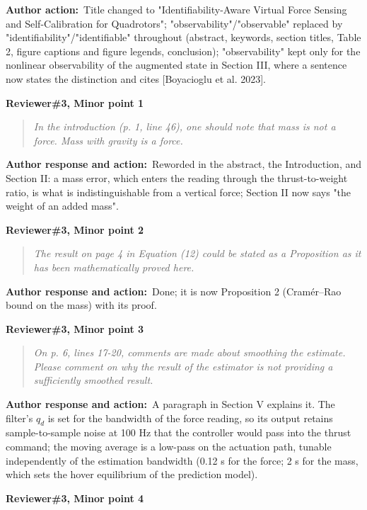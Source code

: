 \documentclass[11pt]{article}
\newcommand{\concern}[1]{\par\medskip\noindent\colorbox{gray!12}{\parbox{\dimexpr\linewidth-2\fboxsep}{\textbf{#1}}}\par\smallskip}
\newcommand{\rlabel}[1]{\par\textbf{#1}\ }
\begin{document}
\rlabel{Author action:}Title changed to "Identifiability-Aware Virtual Force Sensing and Self-Calibration for Quadrotors"; "observability"/"observable" replaced by "identifiability"/"identifiable" throughout (abstract, keywords, section titles, Table 2, figure captions and figure legends, conclusion); "observability" kept only for the nonlinear observability of the augmented state in Section III, where a sentence now states the distinction and cites [Boyacioglu et al. 2023].

\concern{Reviewer\#3, Minor point 1}

\begin{quote}\itshape In the introduction (p. 1, line 46), one should note that mass is not a force. Mass with gravity is a force.\end{quote}

\rlabel{Author response and action:}Reworded in the abstract, the Introduction, and Section II: a mass error, which enters the reading through the thrust-to-weight ratio, is what is indistinguishable from a vertical force; Section II now says "the weight of an added mass".

\concern{Reviewer\#3, Minor point 2}

\begin{quote}\itshape The result on page 4 in Equation (12) could be stated as a Proposition as it has been mathematically proved here.\end{quote}

\rlabel{Author response and action:}Done; it is now Proposition 2 (Cram\'er--Rao bound on the mass) with its proof.

\concern{Reviewer\#3, Minor point 3}

\begin{quote}\itshape On p. 6, lines 17-20, comments are made about smoothing the estimate. Please comment on why the result of the estimator is not providing a sufficiently smoothed result.\end{quote}

\rlabel{Author response and action:}A paragraph in Section V explains it. The filter's $q_d$ is set for the bandwidth of the force reading, so its output retains sample-to-sample noise at 100 Hz that the controller would pass into the thrust command; the moving average is a low-pass on the actuation path, tunable independently of the estimation bandwidth (0.12 s for the force; 2 s for the mass, which sets the hover equilibrium of the prediction model).

\concern{Reviewer\#3, Minor point 4}
\end{document}
